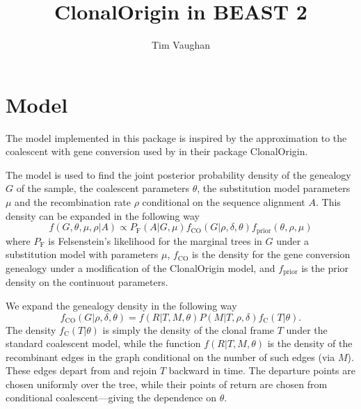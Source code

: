 \documentclass[a4paper,10pt]{article}
\title{ClonalOrigin in BEAST 2}
\author{Tim Vaughan}
\begin{document}
\maketitle{}

\section{Model}

The model implemented in this package is inspired by the approximation
to the coalescent with gene conversion \citep{Wiuf2000a} used by
\cite{Didelot2010} in their package ClonalOrigin. 

The model is used to find the joint posterior probability density of the
genealogy $G$ of the sample, the coalescent parameters $\theta$, the
substitution model parameters $\mu$ and the recombination rate $\rho$
conditional on the sequence alignment $A$.  This density can be
expanded in the following way
\begin{equation}
f(G,\theta,\mu,\rho|A) \propto P_{\mathrm{F}}(A|G,\mu)f_{\mathrm{CO}}(G|\rho,\delta,\theta)f_{\mathrm{prior}}(\theta,\rho,\mu)
\end{equation}
where $P_{\mathrm{F}}$ is Felsenstein's likelihood for the marginal
trees in $G$ under a substitution model with parameters $\mu$,
$f_{\mathrm{CO}}$ is the density for the gene conversion genealogy
under a modification of the ClonalOrigin model, and
$f_{\mathrm{prior}}$ is the prior density on the continuout
parameters.

We expand the genealogy density in the following way
\begin{equation}
f_{\mathrm{CO}}(G|\rho,\delta,\theta)=f(R|T,M,\theta)P(M|T,\rho,\delta)f_{\mathrm{C}}(T|\theta).
\end{equation}
The density $f_{\mathrm{C}}(T|\theta)$ is simply the density of the
clonal frame $T$ under the standard coalescent model, while the function
$f(R|T,M,\theta)$ is the density of the recombinant edges in the
graph conditional on the number of such edges (via $M$).  These edges
depart from and rejoin $T$ backward in time.  The departure points are
chosen uniformly over the tree, while their points of return are
chosen from conditional coalescent---giving the dependence on
$\theta$.
\end{document}
